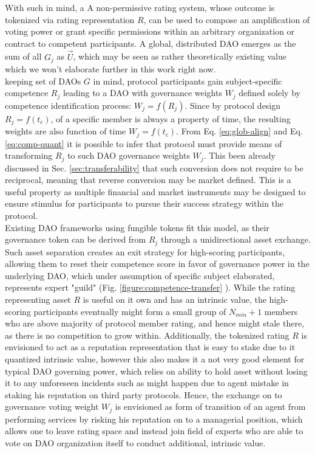 \documentclass{article}
\begin{document}
\begin{CJK}{UTF8}{gbsn}
\begin{multicols}{2}
        With such in mind, a A non-permissive rating system, whose outcome is tokenized via rating representation $R$, can be used to compose an amplification of voting power or grant specific permissions within an arbitrary organization or contract to competent participants.
        A global, distributed DAO emerges as the sum of all $G_j$ as $\vec{U}$, which may be seen as rather theoretically existing value which we won't elaborate further in this work right now.\\ keeping set of DAOs $G$ in mind, protocol participants gain subject-specific competence $R_{j}$ leading to a DAO with governance weights $W_j$ defined solely by competence identification process: $W_j = f(R_{j})$. Since by protocol design $R_j=f(t_c)$, of a specific member is always a property of time, the resulting weights are also function of time $W_j=f(t_c)$. From Eq. \ref{eq:glob-align} and Eq. \ref{eq:comp-quant} it is possible to infer that protocol must provide means of transforming $R_j$ to such DAO governance weights $W_j$.  This been already discussed in Sec. \ref{sec:transferability} that such conversion does not require to be reciprocal, meaning that reverse conversion may be market defined. This is a useful property as multiple financial and market instruments may be designed to ensure stimulus for participants to pursue their success strategy within the protocol.  \\ 
        Existing DAO frameworks using fungible tokens fit this model, as their governance token can be derived from $R_{j}$ through a unidirectional asset exchange. Such asset separation creates an exit strategy for high-scoring participants, allowing them to reset their competence score in favor of governance power in the underlying DAO, which under assumption of specific subject elaborated, represents expert "guild" (Fig. \ref{figure:competence-transfer} ).
        While the rating representing asset $R$ is useful on it own and has an intrinsic value, the high-scoring participants eventually might form a small group of $N_{min}+1$ members who are above majority of protocol member rating, and hence might stale there, as there is no competition to grow within. Additionally, the tokenized rating $R$ is envisioned to act as a reputation representation that is easy to stake due to it quantized intrinsic value, however this also makes it a not very good element for typical DAO governing power, which relies on ability to hold asset without losing it to any unforeseen incidents such as might happen due to agent mistake in staking his reputation on third party protocols. Hence, the exchange on to governance voting weight $W_j$ is envisioned as form of transition of an agent from performing services by risking his reputation on to a managerial position, which allows one to leave rating space and instead join field of experts who are able to vote on DAO organization itself to conduct additional, intrinsic value.


\end{multicols}
\end{CJK}
\end{document}
